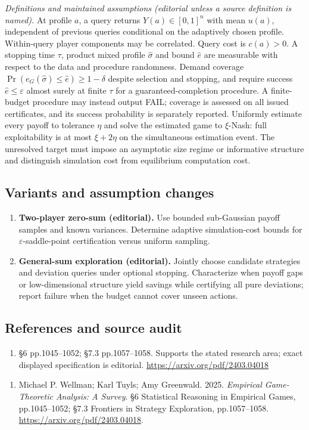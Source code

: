 \documentclass[11pt,a4paper]{article}
\begin{document}
\emph{Definitions and maintained assumptions (editorial unless a source definition is named).} At profile \(a\), a query returns \(Y(a)\in[0,1]^n\) with mean \(u(a)\), independent of previous queries conditional on the adaptively chosen profile. Within-query player components may be correlated. Query cost is \(c(a)>0\). A stopping time \(\tau\), product mixed profile \(\widehat\sigma\) and bound \(\widehat e\) are measurable with respect to the data and procedure randomness. Demand coverage \(\Pr(e_G(\widehat\sigma)\le\widehat e)\ge1-\delta\) despite selection and stopping, and require success \(\widehat e\le\varepsilon\) almost surely at finite \(\tau\) for a guaranteed-completion procedure. A finite-budget procedure may instead output FAIL; coverage is assessed on all issued certificates, and its success probability is separately reported. Uniformly estimate every payoff to tolerance \(\eta\) and solve the estimated game to \(\xi\)-Nash: full exploitability is at most \(\xi+2\eta\) on the simultaneous estimation event. The unresolved target must impose an asymptotic size regime or informative structure and distinguish simulation cost from equilibrium computation cost.
\subsection*{Variants and assumption changes}
\begin{enumerate}
\item \textbf{Two-player zero-sum (editorial).} Use bounded sub-Gaussian payoff samples and known variances. Determine adaptive simulation-cost bounds for \(\varepsilon\)-saddle-point certification versus uniform sampling.
\item \textbf{General-sum exploration (editorial).} Jointly choose candidate strategies and deviation queries under optional stopping. Characterize when payoff gaps or low-dimensional structure yield savings while certifying all pure deviations; report failure when the budget cannot cover unseen actions.
\end{enumerate}
\subsection*{References and source audit}
\begin{enumerate}
\item §6 pp.1045–1052; §7.3 pp.1057–1058. Supports the stated research area; exact displayed specification is editorial. \url{https://arxiv.org/pdf/2403.04018}
\end{enumerate}
\begin{enumerate}\raggedright
\item\hypertarget{definitions:source:30007570:1}{} Michael P. Wellman; Karl Tuyls; Amy Greenwald. 2025. \emph{Empirical Game-Theoretic Analysis: A Survey}. §6 Statistical Reasoning in Empirical Games, pp.1045–1052; §7.3 Frontiers in Strategy Exploration, pp.1057–1058.
\url{https://arxiv.org/pdf/2403.04018}.
\end{enumerate}
\end{document}
